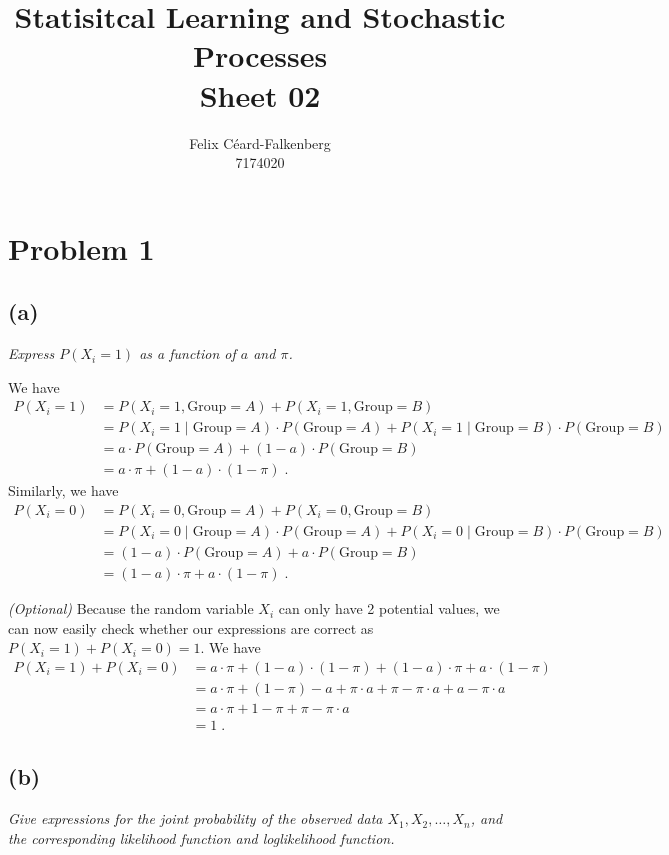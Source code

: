 \documentclass{article}
\title{Statisitcal Learning and Stochastic Processes \\Sheet 02 }
\author{Felix Céard-Falkenberg\\7174020}
\newcommand{\group}{\ensuremath{\text{Group}}}
\begin{document}
\section*{Problem 1}
\subsection*{(a)}
\textit{Express $P(X_i = 1)$ as a function of $a$ and $\pi$.}

We have
\begin{align*}
    P(X_i = 1) &= P(X_i = 1, \group = A) + P(X_i=1, \group = B) \\
    &= P(X_i = 1\mid \group = A) \cdot P(\group = A) + P(X_i=1 \mid \group = B) \cdot P(\group = B) \\
    &= a \cdot P(\group = A) + (1-a) \cdot P(\group = B) \\
    &= a \cdot \pi + (1-a) \cdot (1-\pi)\;.
\end{align*}
Similarly, we have
\begin{align*}
    P(X_i = 0) &= P(X_i = 0, \group = A) + P(X_i=0, \group = B) \\
    &= P(X_i = 0\mid \group = A) \cdot P(\group = A) + P(X_i=0 \mid \group = B) \cdot P(\group = B) \\
    &= (1-a) \cdot P(\group = A) + a \cdot P(\group = B) \\
    &= (1-a) \cdot \pi + a \cdot (1-\pi) \;.
\end{align*}

\textit{(Optional)}
Because the random variable $X_i$ can only have 2 potential values, we can now easily check whether our expressions are correct as $P(X_i = 1) + P(X_i = 0) = 1$. We have
\begin{align*}
    P(X_i = 1) + P(X_i = 0) &= a \cdot \pi + (1-a) \cdot (1-\pi) + (1-a) \cdot \pi + a \cdot (1-\pi) \\
    &= a \cdot \pi + (1-\pi) - a +\pi \cdot a + \pi - \pi \cdot a + a - \pi \cdot a \\
    &= a \cdot \pi + 1-\pi + \pi - \pi \cdot a \\
    &= 1\;.
\end{align*}

\subsection*{(b)}
\textit{Give expressions for the joint probability of the observed data $X_1, X_2, \dots , X_n$, and the corresponding likelihood function and loglikelihood function.}
\end{document}
